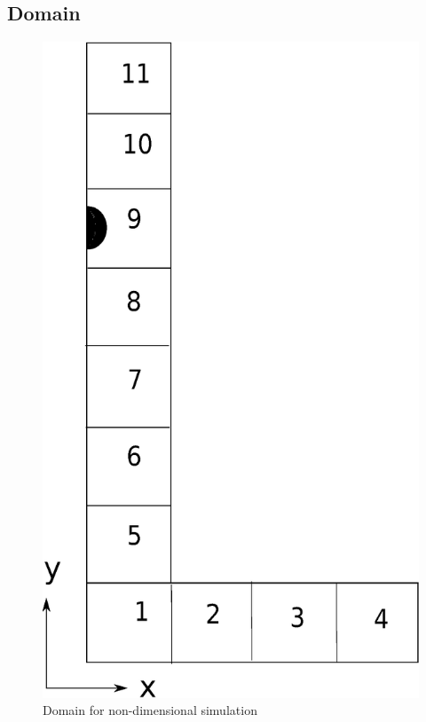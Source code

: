 \subsection{Domain}
\begin{figure}[H]
 \centering
 \includegraphics[scale=0.2]{domain}
 \caption{Domain for non-dimensional simulation}
\end{figure}


